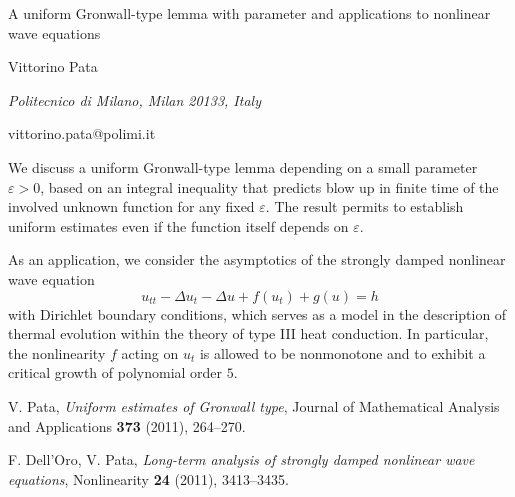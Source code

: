 \documentclass[10pt,a4paper]{article}
\begin{document}
\begin{center}

{\Large A uniform Gronwall-type lemma with parameter and applications to nonlinear wave equations}

\bigskip

{\sc Vittorino Pata}

{\small\it Politecnico di Milano, Milan 20133, Italy}

{\small\rm vittorino.pata@polimi.it}

\end{center}

\bigskip

We discuss
a uniform Gronwall-type lemma depending on a small parameter $\varepsilon>0$,
based on an integral inequality that predicts blow up in finite time of the
involved unknown function for any fixed
$\varepsilon$.
The result permits to establish uniform estimates
even if the function itself
depends on $\varepsilon$.

\noindent
As an application, we consider the asymptotics
of the strongly damped nonlinear wave equation
$$u_{tt}-\Delta u_t-\Delta u+f(u_t)+g(u)=h$$
with Dirichlet boundary conditions, which serves as
a model in the description of thermal evolution within the theory
of type III heat conduction.
In particular, the nonlinearity $f$ acting on $u_t$ is allowed
to be nonmonotone and to exhibit a critical
growth of polynomial order $5$.

\begin{thebibliography}{9}

V. Pata,
\emph{Uniform estimates of Gronwall type},
Journal of Mathematical Analysis and Applications
\textbf{373} (2011), 264--270.


F. Dell'Oro, V. Pata,
\emph{Long-term analysis of strongly damped nonlinear wave equations},
Nonlinearity \textbf{24} (2011), 3413--3435.


\end{thebibliography}
\end{document}
